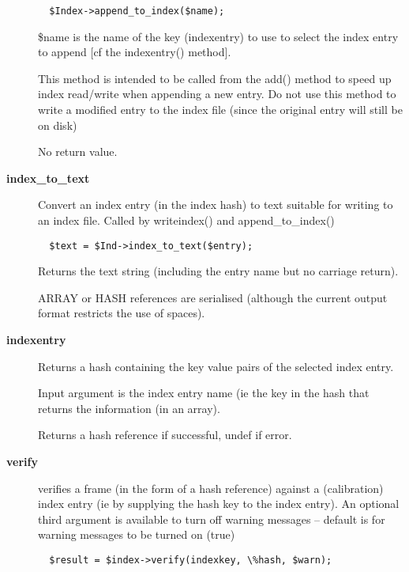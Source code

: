 \begin{description}
\begin{verbatim}
  $Index->append_to_index($name);
\end{verbatim}


\$name is the name of the key (indexentry) to use to select the
index entry to append [cf the indexentry() method].



This method is intended to be called from the add() method
to speed up index read/write when appending a new entry.
Do not use this method to write a modified entry to the
index file (since the original entry will still be on disk)



No return value.


\item[\textbf{index\_to\_text}] \mbox{}

Convert an index entry (in the index hash) to text suitable for
writing to an index file. Called by writeindex() and append\_to\_index()

\begin{verbatim}
  $text = $Ind->index_to_text($entry);
\end{verbatim}


Returns the text string (including the entry name but no carriage 
return).



ARRAY or HASH references are serialised (although the current output
format restricts the use of spaces).


\item[\textbf{indexentry}] \mbox{}

Returns a hash containing the key value pairs of the
selected index entry.



Input argument is the index entry name (ie the key in the hash
that returns the information (in an array).



Returns a hash reference if successful, undef if error.


\item[\textbf{verify}] \mbox{}

verifies a frame (in the form of a hash reference) against a 
(calibration) index entry (ie by supplying the hash key to the index
entry). An optional third argument is available to turn off warning 
messages -- default is for warning messages to be turned on (true)

\begin{verbatim}
  $result = $index->verify(indexkey, \%hash, $warn);
\end{verbatim}



\end{description}
